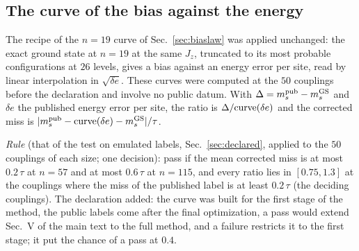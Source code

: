 \documentclass[aps,prx,onecolumn,10pt,nofootinbib,longbibliography,floatfix]{revtex4-2}
\theoremstyle{remark}
\newcommand{\Jz}{J_z}
\newcommand{\ms}{m_s}
\newcommand{\de}{\delta e}
\newcommand{\GS}{\mathrm{GS}}
\begin{document}
\def\SMcap{Mean error $D$ of the public labels, in units of each label's $\tau$, at every coupling; the
abbreviated column holds the second-neighbour correlations. The columns $m_s$ had been seen before the tests were declared.}\def\SMlab{tab:rdtest_d}


\subsection{The curve of the bias against the energy}
\label{sm:publiccurve}
The recipe of the $n=19$ curve of Sec.~\ref{sec:biaslaw} was applied unchanged: the exact ground state at $n=19$ at
the same $\Jz$, truncated to its most probable configurations at $26$ levels, gives a bias against an energy error %
per site, read by linear interpolation in $\sqrt{\de}$. These curves were computed at the $50$ couplings before the %
declaration and involve no public datum. With $\Delta=\ms^{\rm pub}-\ms^{\GS}$ and $\de$ the published energy error
per site, the ratio is $\Delta/{\rm curve}(\de)$ and the corrected miss is $|\ms^{\rm pub}-{\rm curve}(\de)-\ms^{\GS}|/\tau$.

\emph{Rule} (that of the test on emulated labels, Sec.~\ref{sec:declared}, applied to the $50$ couplings of each %
size; one decision): pass if the mean corrected miss is at most $0.2\,\tau$ at $n=57$ and at most $0.6\,\tau$ at %
$n=115$, and every ratio lies in $[0.75,1.3]$ at the couplings where the miss of the published label is at least %
$0.2\,\tau$ (the deciding couplings). The declaration added: the curve was built for the first stage of the method, %
the public labels come after the final optimization, a pass would extend Sec.~V of the main text to the full method,
and a failure restricts it to the first stage; it put the chance of a pass at $0.4$. %
\end{document}
